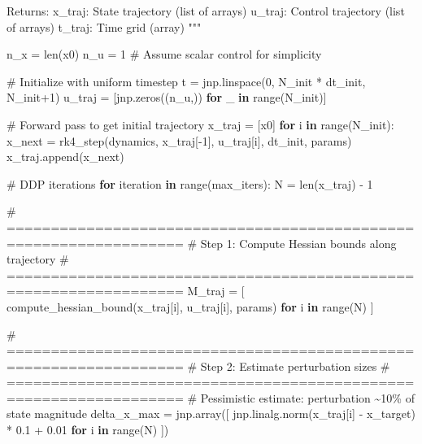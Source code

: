 \documentclass[
  letterpaper,
  DIV=11,
  numbers=noendperiod]{scrartcl}
\newenvironment{Shaded}{\begin{snugshade}}{\end{snugshade}}
\newcommand{\BuiltInTok}[1]{\textcolor[rgb]{0.00,0.23,0.31}{#1}}
\newcommand{\CommentTok}[1]{\textcolor[rgb]{0.37,0.37,0.37}{#1}}
\newcommand{\ControlFlowTok}[1]{\textcolor[rgb]{0.00,0.23,0.31}{\textbf{#1}}}
\newcommand{\DecValTok}[1]{\textcolor[rgb]{0.68,0.00,0.00}{#1}}
\newcommand{\FloatTok}[1]{\textcolor[rgb]{0.68,0.00,0.00}{#1}}
\newcommand{\KeywordTok}[1]{\textcolor[rgb]{0.00,0.23,0.31}{\textbf{#1}}}
\newcommand{\NormalTok}[1]{\textcolor[rgb]{0.00,0.23,0.31}{#1}}
\newcommand{\OperatorTok}[1]{\textcolor[rgb]{0.37,0.37,0.37}{#1}}
\begin{document}
\begin{Shaded}
\begin{Highlighting}[]
\CommentTok{    Returns:}
\CommentTok{        x\_traj: State trajectory (list of arrays)}
\CommentTok{        u\_traj: Control trajectory (list of arrays)}
\CommentTok{        t\_traj: Time grid (array)}
\CommentTok{    """}

\NormalTok{    n\_x }\OperatorTok{=} \BuiltInTok{len}\NormalTok{(x0)}
\NormalTok{    n\_u }\OperatorTok{=} \DecValTok{1}  \CommentTok{\# Assume scalar control for simplicity}

    \CommentTok{\# Initialize with uniform timestep}
\NormalTok{    t }\OperatorTok{=}\NormalTok{ jnp.linspace(}\DecValTok{0}\NormalTok{, N\_init }\OperatorTok{*}\NormalTok{ dt\_init, N\_init}\OperatorTok{+}\DecValTok{1}\NormalTok{)}
\NormalTok{    u\_traj }\OperatorTok{=}\NormalTok{ [jnp.zeros((n\_u,)) }\ControlFlowTok{for}\NormalTok{ \_ }\KeywordTok{in} \BuiltInTok{range}\NormalTok{(N\_init)]}

    \CommentTok{\# Forward pass to get initial trajectory}
\NormalTok{    x\_traj }\OperatorTok{=}\NormalTok{ [x0]}
    \ControlFlowTok{for}\NormalTok{ i }\KeywordTok{in} \BuiltInTok{range}\NormalTok{(N\_init):}
\NormalTok{        x\_next }\OperatorTok{=}\NormalTok{ rk4\_step(dynamics, x\_traj[}\OperatorTok{{-}}\DecValTok{1}\NormalTok{], u\_traj[i], dt\_init, params)}
\NormalTok{        x\_traj.append(x\_next)}

    \CommentTok{\# DDP iterations}
    \ControlFlowTok{for}\NormalTok{ iteration }\KeywordTok{in} \BuiltInTok{range}\NormalTok{(max\_iters):}
\NormalTok{        N }\OperatorTok{=} \BuiltInTok{len}\NormalTok{(x\_traj) }\OperatorTok{{-}} \DecValTok{1}

        \CommentTok{\# ==================================================================}
        \CommentTok{\# Step 1: Compute Hessian bounds along trajectory}
        \CommentTok{\# ==================================================================}
\NormalTok{        M\_traj }\OperatorTok{=}\NormalTok{ [}
\NormalTok{            compute\_hessian\_bound(x\_traj[i], u\_traj[i], params)}
            \ControlFlowTok{for}\NormalTok{ i }\KeywordTok{in} \BuiltInTok{range}\NormalTok{(N)}
\NormalTok{        ]}

        \CommentTok{\# ==================================================================}
        \CommentTok{\# Step 2: Estimate perturbation sizes}
        \CommentTok{\# ==================================================================}
        \CommentTok{\# Pessimistic estimate: perturbation \textasciitilde{}10\% of state magnitude}
\NormalTok{        delta\_x\_max }\OperatorTok{=}\NormalTok{ jnp.array([}
\NormalTok{            jnp.linalg.norm(x\_traj[i] }\OperatorTok{{-}}\NormalTok{ x\_target) }\OperatorTok{*} \FloatTok{0.1} \OperatorTok{+} \FloatTok{0.01}
            \ControlFlowTok{for}\NormalTok{ i }\KeywordTok{in} \BuiltInTok{range}\NormalTok{(N)}
\NormalTok{        ])}


\end{Highlighting}
\end{Shaded}
\end{document}
